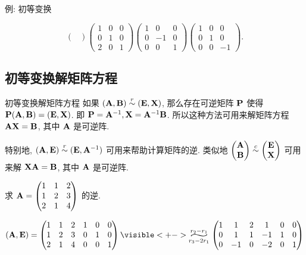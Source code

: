 \begin{frame}{例: 初等变换}
\begin{solution}
{\[\begin{pmatrix}
		\end{pmatrix}\begin{pmatrix}
			1&0&0\\0&1&0\\2&0&1
		\end{pmatrix}\begin{pmatrix}
			1&0&0\\0&-1&0\\0&0&1
		\end{pmatrix}\begin{pmatrix}
			1&0&0\\0&1&0\\0&0&-1
		\end{pmatrix}.\]}
		\vspace{-.3\baselineskip}
	\end{solution}
	\endgroup
\end{frame}




\subsection{初等变换解矩阵方程}
\begin{frame}{初等变换解矩阵方程}
	\onslide<+->
	如果 $({\mathbf{A}},{\mathbf{B}})\mathrel{\overset{r}{\sim}} ({\mathbf{E}},{\mathbf{X}})$, 那么存在可逆矩阵 ${\mathbf{P}}$ 使得 ${\mathbf{P}}({\mathbf{A}},{\mathbf{B}})=({\mathbf{E}},{\mathbf{X}})$.
	\onslide<+->
	即 ${\mathbf{P}}={\mathbf{A}}^{-1},{\mathbf{X}}={\mathbf{A}}^{-1}{\mathbf{B}}$.
	\onslide<+->
	所以这种方法可用来解矩阵方程 ${\mathbf{A}}{\mathbf{X}}={\mathbf{B}}$, 其中 ${\mathbf{A}}$ 是可逆阵.

	\onslide<+->
	特别地, \alert{$({\mathbf{A}},{\mathbf{E}})\mathrel{\overset{r}{\sim}}({\mathbf{E}},{\mathbf{A}}^{-1})$} 可用来帮助计算矩阵的逆.
	\onslide<+->
	类似地 $\begin{pmatrix}
		{\mathbf{A}}\\
		{\mathbf{B}}
	\end{pmatrix}\mathrel{\overset{c}{\sim}}\begin{pmatrix}
		{\mathbf{E}}\\
		{\mathbf{X}}
	\end{pmatrix}$ 可用来解 ${\mathbf{X}}{\mathbf{A}}={\mathbf{B}}$, 其中 ${\mathbf{A}}$ 是可逆阵.

	\onslide<+->
	\begin{exercise}
		求 ${\mathbf{A}}=\begin{pmatrix}
			1&1&2\\1&2&3\\2&1&4
		\end{pmatrix}$ 的逆.
	\end{exercise}
	\onslide<+->
	\begin{solution}
		\[(\bfA,\bfE)=\begin{pmatrix}
			1&1&2&1&0&0\\
			1&2&3&0&1&0\\
			2&1&4&0&0&1
		\end{pmatrix}
		\visible<+->{\wsim[3]{r_2-r_1}{r_3-2r_1}\begin{pmatrix}
			1&1&2&1&0&0\\
			0&1&1&-1&1&0\\
			0&-1&0&-2&0&1
		\end{pmatrix}}\]
		\vspace{-.7\baselineskip}
	\end{solution}
\end{frame}


